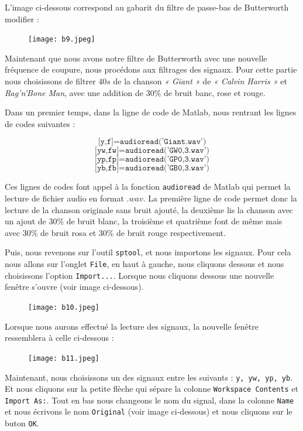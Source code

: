 \documentclass[conference,onecolumn]{IEEEtran}
\begin{document}
L'image ci-dessous correspond au gabarit du filtre de passe-bas de Butterworth modifier :


 \begin{figure}[H]
 \centering
    \texttt{[image: b9.jpeg]}
\end{figure}


Maintenant que nous avons notre filtre de Butterworth avec une nouvelle fréquence de coupure, nous procédons aux filtrages des signaux. Pour cette partie nous choisissons de filtrer $40s$ de la chanson \textit{« Giant »} de \textit{« Calvin Harris »} et \textit{Rag'n'Bone Man}, avec une addition de 30\% de bruit banc, rose et rouge.

Dans un premier temps, dans la ligne de code de Matlab, nous rentrant les lignes de codes suivantes :

\[ \texttt{[y,f]=audioread('Giant.wav')}\]
\[ \texttt{[yw,fw]=audioread('GW0,3.wav')}\]
\[ \texttt{[yp,fp]=audioread('GP0,3.wav')}\]
\[ \texttt{[yb,fb]=audioread('GB0,3.wav')}\]

Ces lignes de codes font appel à la fonction \texttt{audioread} de Matlab qui permet la lecture de fichier audio en format $.wav$. La première ligne de code permet donc la lecture de la chanson originale sans bruit ajouté, la deuxième lis la chanson avec un ajout de 30\% de bruit blanc, la troisième et quatrième font de même mais avec 30\% de bruit rosa et 30\% de bruit rouge respectivement.

Puis, nous revenons sur l'outil \texttt{sptool}, et nous importons les signaux. Pour cela nous allons sur l'onglet \texttt{File}, en haut à gauche, nous cliquons dessous et nous choisissons l'option \texttt{Import...}. Lorsque nous cliquons dessous une nouvelle fenêtre s'ouvre (voir image ci-dessous).

 \begin{figure}[H]
 \centering
    \texttt{[image: b10.jpeg]}
\end{figure}



Lorsque nous aurons effectué la lecture des signaux, la nouvelle fenêtre ressemblera à celle ci-dessous :

 \begin{figure}[H]
 \centering
    \texttt{[image: b11.jpeg]}
\end{figure}


Maintenant, nous choisissons un des signaux entre les suivants : \texttt{y, yw, yp, yb}. Et nous cliquons sur la petite flèche qui sépare la colonne \texttt{Workspace Contents} et \texttt{Import As:}. Tout en bas nous changeons le nom du signal, dans la colonne \texttt{Name} et nous écrivons le nom \texttt{Original} (voir image ci-dessous) et nous cliquons sur le buton \texttt{OK}.
\end{document}
